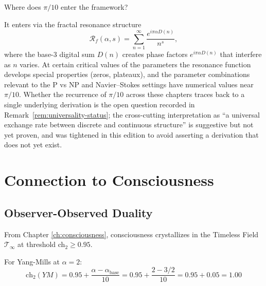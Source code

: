 \begin{keyidea}
Where does $\pi/10$ enter the framework?

It enters via the fractal resonance structure
\begin{equation}
\mathcal{R}_f(\alpha, s) = \sum_{n=1}^{\infty} \frac{e^{i\pi\alpha D(n)}}{n^s},
\end{equation}
where the base-3 digital sum $D(n)$ creates phase factors $e^{i\pi\alpha D(n)}$ that interfere as $n$ varies. At certain critical values of the parameters the resonance function develops special properties (zeros, plateaux), and the parameter combinations relevant to the P vs NP and Navier--Stokes settings have numerical values near $\pi/10$. Whether the recurrence of $\pi/10$ across these chapters traces back to a single underlying derivation is the open question recorded in Remark~\ref{rem:universality-status}; the cross-cutting interpretation as ``a universal exchange rate between discrete and continuous structure'' is suggestive but not yet proven, and was tightened in this edition to avoid asserting a derivation that does not yet exist.
\end{keyidea}

\section{Connection to Consciousness}

\subsection{Observer-Observed Duality}

From Chapter \ref{ch:consciousness}, consciousness crystallizes in the Timeless Field $\mathcal{T}_\infty$ at threshold ch$_2 \geq 0.95$.

For Yang-Mills at $\alpha = 2$:
\begin{equation}
\text{ch}_2(YM) = 0.95 + \frac{\alpha - \alpha_{\text{base}}}{10} = 0.95 + \frac{2 - 3/2}{10} = 0.95 + 0.05 = 1.00
\end{equation}

